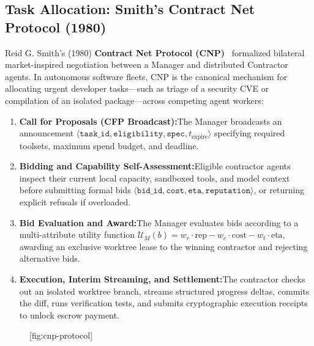 \documentclass[11pt,a4paper]{article}
\begin{document}
\subsection{Task Allocation: Smith's Contract Net Protocol (1980)}

Reid G. Smith's (1980) \textbf{Contract Net Protocol (CNP)}~ formalized bilateral market-inspired negotiation between a Manager and distributed Contractor agents. In autonomous software fleets, CNP is the canonical mechanism for allocating urgent developer tasks---such as triage of a security CVE or compilation of an isolated package---across competing agent workers:

\begin{enumerate}[leftmargin=1.8em,itemsep=2pt]
  \item \textbf{Call for Proposals (CFP Broadcast):}\enspace The Manager broadcasts an announcement $\langle\mathtt{task\_id}, \allowbreak \mathtt{eligibility}, \allowbreak \mathtt{spec}, \allowbreak t_{\text{expire}}\rangle$ specifying required toolsets, maximum spend budget, and deadline.
  \item \textbf{Bidding and Capability Self-Assessment:}\enspace Eligible contractor agents inspect their current local capacity, sandboxed tools, and model context before submitting formal bids $\langle\mathtt{bid\_id}, \allowbreak \mathtt{cost}, \allowbreak \mathtt{eta}, \allowbreak \mathtt{reputation}\rangle$, or returning explicit refusals if overloaded.
  \item \textbf{Bid Evaluation and Award:}\enspace The Manager evaluates bids according to a multi-attribute utility function $\mathcal{U}_M(b) = w_r \cdot \text{rep} - w_c \cdot \text{cost} - w_t \cdot \text{eta}$, awarding an exclusive worktree lease to the winning contractor and rejecting alternative bids.
  \item \textbf{Execution, Interim Streaming, and Settlement:}\enspace The contractor checks out an isolated worktree branch, streams structured progress deltas, commits the diff, runs verification tests, and submits cryptographic execution receipts to unlock escrow payment.
\end{enumerate}

\begin{figure}[tp]
  \centering
  [fig:cnp-protocol]
\end{figure}
\end{document}
